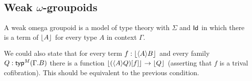 \begin{comment}
\begin{defn}
A function $f:\prd{x:\terms{A}}\terms{\subst{x}{P}}$ is said to be \emph{continuous}
if there is a term of type
\begin{equation*}
\prd{x,y:\terms{A}}\terms{\subst{\ctxwk{A}{\mathcal{T}rans_{x,y}}}{\ctxwk{\idtypevar{A}}{\idtypevar{\subst{y}{P}}}}}.
\end{equation*}
\end{defn}

\begin{lem}
If all functions are ``continuous mappings of terms'' then types without terms
are empty, i.e.\ we have
\begin{equation*}
(\terms{A}\to\emptyt)\to\terms{A\to\emptyt^\mfGraph}
\end{equation*}
\end{lem}

\begin{proof}
Any function from a type without terms is vacuously continuous.
\end{proof}

We will see that in the graph model functions are not just continuous mappings
of terms, since there is a graph $\tilde{\emptyt}$ which has no terms but which
differs from the empty graph nevertheless.

\begin{desiderata}
The following may relate to functions being continuous mappings of terms (it
seems to be a very strong condition):
\begin{enumerate}
\item We have the adjunctions $\tfcolim\dashv\Delta\dashv\tflim$ in which the
two monads are idempotent (we don't even have the adjunctions for $\mfGraph$).
\item $\eqv{\terms{\Omega}}{\ctx}$
\end{enumerate}
We also need to check whether all functions in the reflexive graphs have this
property (if not, ditch this section).
\end{desiderata}
\end{comment}

\subsection{Weak $\omega$-groupoids}

A weak omega groupoid is a model of type theory with $\Sigma$ and $\mathsf{Id}_{}$
in which there is a term of $\lfloor A \rfloor^{}$ for every type $A$ in context $\Gamma$.

We could also state that for every term $f:\terms{\ctxwk{A}{B}}$ and every
family $Q:\tftyp{\mfM}{\ctxext{\Gamma}{B}}$ there is a function
$\terms{\subst{f}{\ctxwk{A}{Q}}}\to\terms{Q}$ (asserting that $f$ is a trival
cofibration). This should be equivalent to the previous condition.
